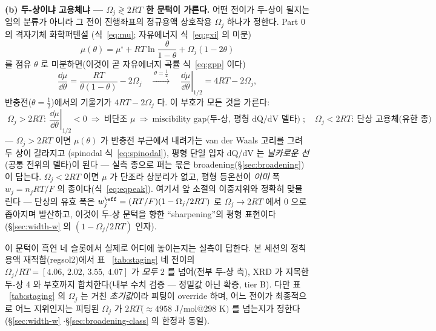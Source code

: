 \textbf{(b) 두-상이냐 고용체냐 --- $\Omega_j\!\gtrless\!2RT$ 한 문턱이 가른다.} 어떤 전이가 두-상이 될지는 임의
분류가 아니라 그 전이 진행좌표의 정규용액 상호작용 $\Omega_j$ 하나가 정한다. Part 0 의 격자기체 화학퍼텐셜
(식~\eqref{eq:mu}; 자유에너지 식~\eqref{eq:gxi} 의 미분)
\begin{equation}
\mu(\theta)=\mu^\circ+RT\ln\frac{\theta}{1-\theta}+\Omega_j(1-2\theta)
\label{eq:gr-mu}
\end{equation}
를 점유 $\theta$ 로 미분하면(이것이 곧 자유에너지 곡률 식~\eqref{eq:gpp} 이다)
\begin{equation}
\frac{\dd\mu}{\dd\theta}=\frac{RT}{\theta(1-\theta)}-2\Omega_j
\quad\xrightarrow{\ \theta=\frac12\ }\quad
\left.\frac{\dd\mu}{\dd\theta}\right|_{1/2}=4RT-2\Omega_j,
\label{eq:gr-dmudtheta}
\end{equation}
반충전($\theta=\tfrac12$)에서의 기울기가 $4RT-2\Omega_j$ 다. 이 부호가 모든 것을 가른다:
\begin{equation}
\boxed{\;
\Omega_j>2RT:\ \left.\frac{\dd\mu}{\dd\theta}\right|_{1/2}<0\ \Rightarrow\ \text{비단조 }\mu\ \Rightarrow\
\text{miscibility gap(두-상, 평형 dQ/dV 델타)}\;;\quad
\Omega_j<2RT:\ \text{단상 고용체(유한 종)}\;}
\label{eq:gr-criterion}
\end{equation}
--- $\Omega_j>2RT$ 이면 $\mu(\theta)$ 가 반충전 부근에서 내려가는 van der Waals 고리를 그려 두 상이 갈라지고
(spinodal 식~\eqref{eq:spinodal}), 평형 단일 입자 dQ/dV 는 \emph{날카로운 선}(공통 전위의 델타)이 된다 --- 실측
종으로 펴는 몫은 broadening(\S\ref{sec:broadening})이 담는다. $\Omega_j<2RT$ 이면 $\mu$ 가 단조라 상분리가 없고,
평형 등온선이 \emph{이미} 폭 $w_j=n_jRT/F$ 의 종이다(식~\eqref{eq:eqpeak}). 여기서 앞 소절의 이중지위와 정확히
맞물린다 --- 단상의 유효 폭은 $w_j^{\eff}=(RT/F)(1-\Omega_j/2RT)$ 로 $\Omega_j\!\to\!2RT$ 에서 0 으로 좁아지며
발산하고, 이것이 두-상 문턱을 향한 ``sharpening''의 평형 표현이다(\S\ref{sec:width-w} 의 $(1-\Omega_j/2RT)$ 인자).

이 문턱이 흑연 네 슬롯에서 실제로 어디에 놓이는지는 실측이 답한다. 본 세션의 정칙용액 재적합(regsol2)에서 표
~\ref{tab:staging} 네 전이의 $\Omega_j/RT=[4.06,\,2.02,\,3.55,\,4.07]$ 가 \emph{모두} $2$ 를 넘어(전부 두-상 측),
XRD 가 지목한 두-상 4 와 부호까지 합치한다(내부 수치 검증 --- 정밀값 아닌 확증, tier B). 다만 표
~\ref{tab:staging} 의 $\Omega_j$ 는 거친 \emph{초기값}이라 피팅이 override 하며, 어느 전이가 최종적으로 어느
지위인지는 피팅된 $\Omega_j$ 가 $2RT(\!\approx\!4958$ J/mol$@298$ K$)$ 를 넘는지가 정한다(\S\ref{sec:width-w}
$\cdot$\S\ref{sec:broadening-class} 의 한정과 동일).

